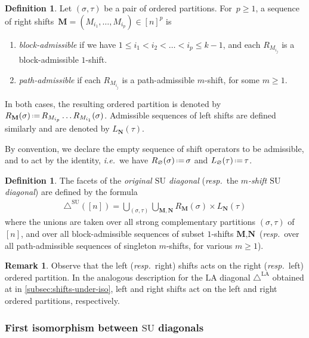 \documentclass{amsart}
\newcommand{\darkblue}{\color{darkblue}} %
\theoremstyle{definition}
\newtheorem{definition}[theorem]{Definition}
\newtheorem{remark}[theorem]{Remark}
\newcommand{\eqdef}{\mbox{\,\raisebox{0.2ex}{\scriptsize\ensuremath{\mathrm:}}\ensuremath{=}\,}} %
\newcommand{\ie}{\textit{i.e.}~} %
\newcommand{\resp}{\textit{resp.}~} %
\newcommand{\defn}[1]{\textsl{\darkblue #1}} %
\newcommand{\SU}{\mathrm{SU}}
\newcommand{\LA}{\mathrm{LA}}
\newcommand{\SUD}{\triangle^{\mathrm{SU}}}
\newcommand{\LAD}{\triangle^{\mathrm{LA}}}
\begin{document}
\begin{definition}
\label{def:admissible-shift-sequences}
Let $(\sigma,\tau)$ be a pair of ordered partitions. 
For~$p\geq 1$, a sequence of right shifts~$\textbf{M} = (M_{i_1},\dots,M_{i_p}) \in [n]^{p}$ is 
\begin{enumerate}
	\item \defn{block-admissible} if we have $1\leq i_1 < i_2 < \dots < i_p \leq k-1$, and each $R_{M_{i_j}}$ is a block-admissible $1$-shift.
	\item \defn{path-admissible} if each $R_{M_{i_j}}$ is a path-admissible $m$-shift, for some $m\geq 1$.
\end{enumerate}
In both cases, the resulting ordered partition is denoted by $R_\mathbf{M}(\sigma) \eqdef R_{M_{i_p}}\dots R_{M_{i_1}}(\sigma)$.
Admissible sequences of left shifts are defined similarly and are denoted by $L_\mathbf{N}(\tau)$.
\end{definition}

By convention, we declare the empty sequence of shift operators to be admissible, and to act by the identity, \ie we have $R_{\mathbf{\varnothing}}(\sigma)  \eqdef  \sigma$ and $L_{\mathbf{\varnothing}} (\tau) \eqdef  \tau$.

\begin{definition}
\label{def:classical-SU}
The facets of the \defn{original $\SU$ diagonal} (\resp the \defn{$m$-shift $\SU$ diagonal}) are defined by the formula
\begin{align*}
\SUD([n]) = \bigcup_{(\sigma,\tau)} \bigcup_{\mathbf{M}, \mathbf{N}} R_\mathbf{M}(\sigma)\times L_\mathbf{N}(\tau)
\end{align*}
where the unions are taken over all strong complementary partitions $(\sigma, \tau)$ of $[n]$, and over all block-admissible sequences of subset $1$-shifts $\textbf{M},\textbf{N}$ (\resp over all path-admissible sequences of singleton $m$-shifts, for various $m\geq 1$).
\end{definition}

\begin{remark}
	Observe that the left (\resp right) shifts acts on the right (\resp left) ordered partition.
	In the analogous description for the $\LA$ diagonal $\LAD$ obtained at in \cref{subsec:shifts-under-iso}, left and right shifts act on the left and right ordered partitions, respectively.
\end{remark}


\subsubsection{First isomorphism between $\SU$ diagonals}
\end{document}
